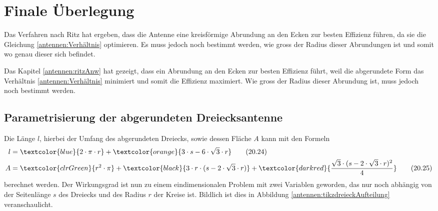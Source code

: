 %
%
% 
%
%
\usetikzlibrary{spy}
\section{Finale Überlegung\label{antennen:resultat}}

Das Verfahren nach Ritz hat ergeben, dass die Antenne eine kreisförmige Abrundung an den Ecken 
zur besten Effizienz führen, da sie die Gleichung \eqref{antennen:Verhältnis} optimieren. 
Es muss jedoch noch bestimmt werden, wie gross der Radius dieser Abrundungen ist und somit wo
genau dieser sich befindet. 

Das Kapitel \ref{antennen:ritzAnw} hat gezeigt, dass ein Abrundung an den Ecken
zur besten Effizienz führt, weil die abgerundete Form das Verhältnis \eqref{antennen:Verhältnis}
minimiert und somit die Effizienz maximiert. Wie gross der Radius dieser Abrundung
ist, muss jedoch noch bestimmt werden.


\subsection{Parametrisierung der abgerundeten Dreiecksantenne\label{antennen:param3eck}}
Die Länge $l$, hierbei der Umfang 
des abgerundeten Dreiecks, sowie dessen Fläche $A$ kann mit den Formeln
\begin{align}
	l &= \textcolor{blue}{2 \cdot \pi \cdot r} + \textcolor{orange}{3 \cdot s - 6 \cdot \sqrt{3} \cdot r} \tag{20.24} \label{antennen:Länge} \\
	A &= \textcolor{clrGreen}{r^2 \cdot \pi} + \textcolor{black}{3 \cdot r \cdot (s - 2 \cdot \sqrt{3} \cdot r)} + \textcolor{darkred}{\frac{\sqrt{3} \cdot (s - 2 \cdot \sqrt{3} \cdot r)^2}{4}} \tag{20.25} \label{antennen:Fläche}
\end{align}
\setcounter{equation}{25}
berechnet werden.
Der Wirkungsgrad ist nun zu einem eindimensionalen Problem mit zwei Variablen geworden, das nur noch abhängig von 
der Seitenlänge $s$ des Dreiecks und des Radius $r$ der Kreise ist. Bildlich ist dies 
in Abbildung \ref{antennen:tikzdreieckAufteilung} veranschaulicht.

